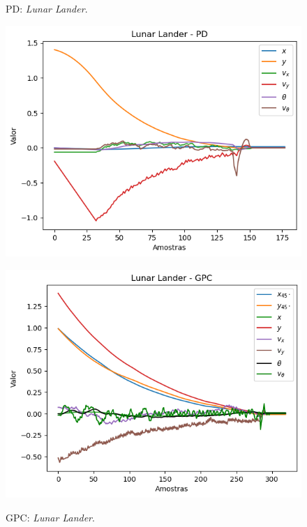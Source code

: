 \documentclass[12pt,           %
a4paper,                       %
openany,                       %
oneside,                       %
chapter=TITLE,                 %
english,                       %
spanish,                       %
brazil,                        %
sumario=tradicional]{abntex2}  %
\begin{document}
\begin{OnehalfSpace}
\begin{figure}[H]
  \begin{minipage}{0.44\textwidth}
    \centering
     \caption{PD: \textit{Lunar Lander}.}
     \includegraphics[scale=0.5]{llpid.png}
    \label{fig:llpid}
  \end{minipage}
  \begin{minipage}{0.44\textwidth}
    \centering
     \caption{GPC: \textit{Lunar Lander}.}
     \includegraphics[scale=0.5]{llgpc.png}
    \label{fig:imagem2}
  \end{minipage}
\end{figure}
\vspace*{-.9cm}
{\raggedright {}}


\end{OnehalfSpace}
\end{document}
